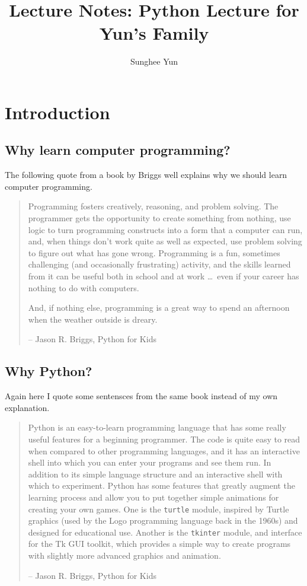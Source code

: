\documentclass{article}
\title{Lecture Notes: Python Lecture for Yun's Family}
\author{Sunghee Yun}
\begin{document}
\maketitle

\section{Introduction}

\subsection{Why learn computer programming?}

The following quote from a book by Briggs
well explains why we should learn computer programming.

\begin{quote}

Programming fosters creatively, reasoning, and problem solving.
The programmer gets the opportunity to create something from nothing, use logic to turn programming constructs into
a form that a computer can run, and, when things don't work quite as well as expected,
use problem solving to figure out what has gone wrong.
Programming is a fun, sometimes challenging
(and  occasionally frustrating) activity,
and the skills learned from it can be useful both in school and at work
\ldots\
even if your career has nothing to do with computers.

And, if nothing else, programming is a great way to spend an afternoon when the weather outside is dreary.

-- Jason R. Briggs, Python for Kids
\end{quote}

\nocite{JR:12}


\subsection{Why Python?}

Again here I quote some sentensces from the same book instead of my own explanation.

\begin{quote}
Python is an easy-to-learn programming language that has some really useful features for a beginning programmer.
The code is quite easy to read when compared to other programming languages,
and it has an interactive shell into which you can enter your programs and see them run.
In addition to its simple language structure and an interactive shell with which to experiment.
Python has some features that greatly augment the learning process
and allow you to put together simple animations for creating your own games.
One is the {\tt turtle} module, inspired by Turtle graphics
(used by the Logo programming language back in the 1960s)
and designed for educational use.
Another is the {\tt tkinter} module,
and interface for the Tk GUI toolkit,
which provides a simple way to create programs with slightly more advanced graphics and animation.

-- Jason R. Briggs, Python for Kids
\end{quote}
\end{document}
